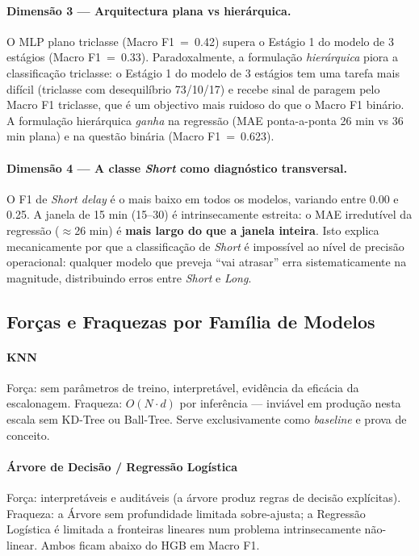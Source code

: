 \documentclass[conference]{IEEEtran}
\begin{document}
\paragraph{Dimensão 3 — Arquitectura plana vs hierárquica.}
O MLP plano triclasse (Macro F1~=~0.42) supera o Estágio 1 do modelo de 3
estágios (Macro F1~=~0.33). Paradoxalmente, a formulação \emph{hierárquica}
piora a classificação triclasse: o Estágio 1 do modelo de 3 estágios tem uma
tarefa mais difícil (triclasse com desequilíbrio 73/10/17) e recebe sinal de
paragem pelo Macro F1 triclasse, que é um objectivo mais ruidoso do que o
Macro F1 binário. A formulação hierárquica \emph{ganha} na regressão (MAE
ponta-a-ponta 26 min vs 36 min plana) e na questão binária (Macro F1~=~0.623).

\paragraph{Dimensão 4 — A classe \textit{Short} como diagnóstico transversal.}
O F1 de \textit{Short delay} é o mais baixo em todos os modelos, variando entre
0.00 e 0.25. A janela de 15 min (15–30) é intrinsecamente estreita: o MAE
irredutível da regressão ($\approx$26 min) é \textbf{mais largo do que a
janela inteira}. Isto explica mecanicamente por que a classificação de
\textit{Short} é impossível ao nível de precisão operacional: qualquer modelo que
preveja ``vai atrasar'' erra sistematicamente na magnitude, distribuindo erros
entre \textit{Short} e \textit{Long}.

\subsection{Forças e Fraquezas por Família de Modelos}

\paragraph{KNN} Força: sem parâmetros de treino, interpretável, evidência da
eficácia da escalonagem. Fraqueza: $O(N \cdot d)$ por inferência — inviável em
produção nesta escala sem KD-Tree ou Ball-Tree. Serve exclusivamente como
\textit{baseline} e prova de conceito.

\paragraph{Árvore de Decisão / Regressão Logística} Força: interpretáveis e
auditáveis (a árvore produz regras de decisão explícitas). Fraqueza: a Árvore
sem profundidade limitada sobre-ajusta; a Regressão Logística é limitada a
fronteiras lineares num problema intrinsecamente não-linear. Ambos ficam abaixo
do HGB em Macro F1.
\end{document}
